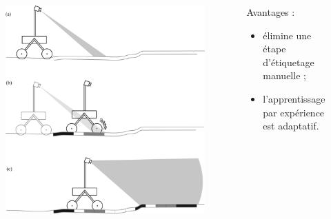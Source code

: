     \begin{frame}[c]
        \begin{columns}[c]
            \begin{column}{0.4\textwidth}
                \begin{figure}
                    \includegraphics[width=\textwidth]{./media/selfSupervised.png}
                \end{figure}            
            \end{column}
            
            \begin{column}{0.6\textwidth}
            Avantages : \\ \vspace{1mm}
                \begin{itemize}
                    \item élimine une étape d'étiquetage manuelle ;
                    \item l'apprentissage par expérience est adaptatif.
                \end{itemize}
            \end{column}
        \end{columns}         
    \end{frame}
    